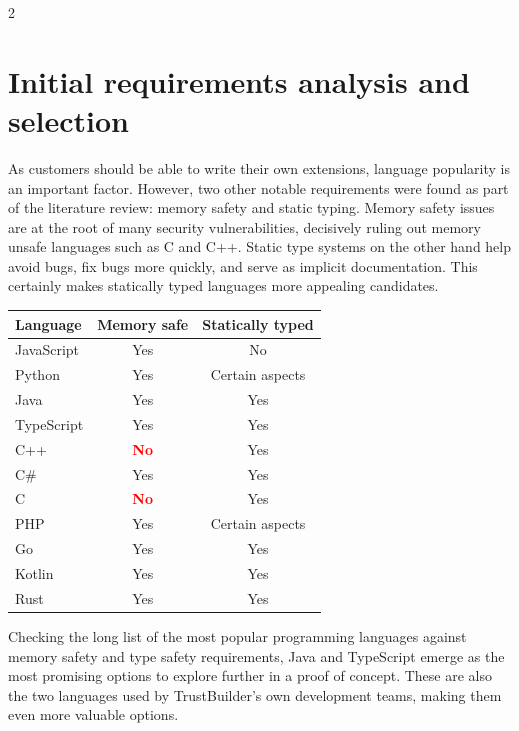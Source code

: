 \documentclass[a0,portrait,english]{hogent-poster}
\begin{document}
\begin{multicols}{2}
\section{Initial requirements analysis and selection}

As customers should be able to write their own extensions, language popularity is an important factor. However, two other notable requirements were found as part of the literature review: memory safety and static typing. Memory safety issues are at the root of many security vulnerabilities, decisively ruling out memory unsafe languages such as C and C++. Static type systems on the other hand help avoid bugs, fix bugs more quickly, and serve as implicit documentation. This certainly makes statically typed languages more appealing candidates.


\begin{center}
  \captionsetup{type=table}
  \begin{tabular}{|l| c c |}
    \hline
    Language & Memory safe & Statically typed \\
    \hline
    JavaScript & Yes & No \\
    Python     & Yes & Certain aspects \\
    Java       & Yes & Yes \\
    TypeScript & Yes & Yes \\
    C++        & \textcolor{red}{\textbf{No}}  & Yes \\
    C\#        & Yes & Yes \\
    C          & \textcolor{red}{\textbf{No}}  & Yes \\
    PHP        & Yes & Certain aspects \\
    Go         & Yes & Yes \\
    Kotlin     & Yes & Yes \\
    Rust       & Yes & Yes \\
    \hline
\end{tabular}
\end{center}

Checking the long list of the most popular programming languages against memory safety and type safety requirements, Java and TypeScript emerge as the most promising options to explore further in a proof of concept. These are also the two languages used by TrustBuilder's own development teams, making them even more valuable options.


\end{multicols}
\end{document}
